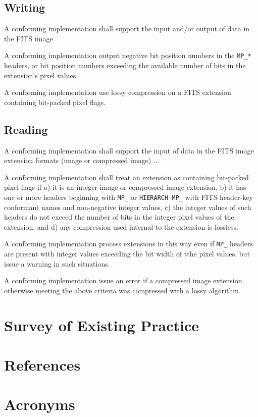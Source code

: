 \documentclass[DM,authoryear,toc]{lsstdoc}
\begin{document}
\subsection{Writing}

A conforming implementation shall support the input and/or output of
data in the FITS image

A conforming implementation  output negative bit position
numbers in the \verb|MP_*| headers, or bit position numbers exceeding the
available number of bits in the extension's pixel values.

A conforming implementation  use lossy compression on
a FITS extension containing bit-packed pixel flags.

\subsection{Reading}

A conforming implementation shall support the input of data in the FITS
image extension formats (image or compressed image) ...

A conforming implementation shall treat an extension as containing
bit-packed pixel flags if a) it is an integer image or compressed image
extension, b) it has one or more headers beginning with \verb|MP_| or
\verb|HIERARCH MP_| with FITS-header-key conformant names and non-negative
integer values, c) the integer values of such headers do not exceed the
number of bits in the integer pixel values of the extension, and d) any
compression used internal to the extension is lossless.

A conforming implementation  process extensions in this way
even if \verb|MP_| headers are present with integer values exceeding the
bit width of tthe pixel values, but  issue a warning in
such situations.

A conforming implementation  issue an error if a compressed
image extension otherwise meeting the above criteria was compressed with a
lossy algorithm.


\section{Survey of Existing Practice}

\appendix
\section{References} \label{sec:bib}
\renewcommand{\refname}{} %


\section{Acronyms} \label{sec:acronyms}

\end{document}

